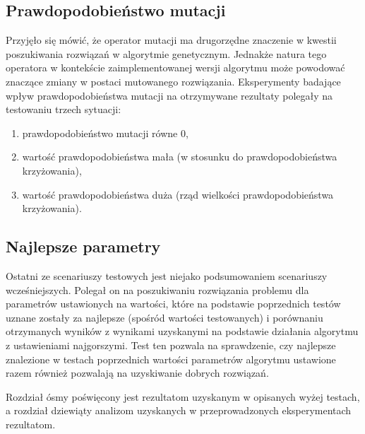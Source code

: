 \subsection{Prawdopodobieństwo mutacji}
Przyjęło się mówić, że operator mutacji ma drugorzędne znaczenie w kwestii poszukiwania rozwiązań w algorytmie genetycznym. Jednakże natura tego operatora w kontekście zaimplementowanej wersji algorytmu może powodować znaczące zmiany w postaci mutowanego rozwiązania. Eksperymenty badające wpływ prawdopodobieństwa mutacji na otrzymywane rezultaty polegały na testowaniu trzech sytuacji:
\begin{enumerate}
\item prawdopodobieństwo mutacji równe 0,
\item wartość prawdopodobieństwa mała (w stosunku do prawdopodobieństwa krzyżowania),
\item wartość prawdopodobieństwa duża (rząd wielkości prawdopodobieństwa krzyżowania).
\end{enumerate}

\subsection{Najlepsze parametry}
Ostatni ze scenariuszy testowych jest niejako podsumowaniem scenariuszy wcześniejszych. Polegał on na poszukiwaniu rozwiązania problemu dla parametrów ustawionych na wartości, które na podstawie poprzednich testów uznane zostały za najlepsze (spośród wartości testowanych) i porównaniu otrzymanych wyników z wynikami uzyskanymi na podstawie działania algorytmu z ustawieniami najgorszymi. Test ten pozwala na sprawdzenie, czy najlepsze znalezione w testach poprzednich wartości parametrów algorytmu ustawione razem również pozwalają na uzyskiwanie dobrych rozwiązań.

Rozdział ósmy poświęcony jest rezultatom uzyskanym w opisanych wyżej testach, a rozdział dziewiąty analizom uzyskanych w przeprowadzonych eksperymentach rezultatom. 